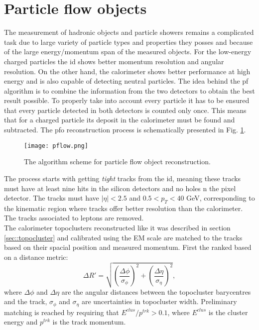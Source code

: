       \section{Particle flow objects}
      The measurement of hadronic objects and particle showers remains a complicated task due to large variety of particle types and properties they posses and because of the large energy/momentum span of the measured objects. For the low-energy charged particles the \gls{id} shows better momentum resolution and angular resolution. On the other hand, the calorimeter shows better performance at high energy and is also capable of detecting neutral particles. The idea behind the \gls{pf} algorithm \cite{pflow} is to combine the information from the two detectors to obtain the best result possible. To properly take into account every particle it has to be ensured that every particle detected in both detectors is counted only once. This means that for a charged particle its deposit in the calorimeter must be found and subtracted. The \gls{pfo} reconstruction process is schematically presented in Fig. \ref{fig::pflow}.
      	\begin{figure}[htbp]
      	\centering
      	\texttt{[image: pflow.png]}
      	\caption[pflow]{The algorithm scheme for particle flow object reconstruction.}
      	\label{fig::pflow}
      \end{figure}
  	  The process starts with getting \textit{tight} tracks from the \gls{id}, meaning these tracks must have at least nine hits in the silicon detectors and no holes n the pixel detector. The tracks must have $|\eta| < 2.5$ and $0.5 < p_T < 40$ GeV, corresponding to the kinematic region where tracks offer better resolution than the calorimeter. The tracks associated to leptons are removed. \\
  	  The calorimeter topoclusters reconstructed like it was described in section \ref{sec::topocluster} and calibrated using the EM scale are matched to the tracks based on their spacial position and measured momentum. First the ranked based on a distance metric:
  	  	\begin{equation}
  	  \Delta R'=\sqrt{\left(\frac{\Delta \phi}{\sigma_{\phi}}\right)^2+\left(\frac{\Delta \eta}{\sigma_{\eta}}\right)^2},
  	  \end{equation}
  	  where $\Delta \phi$ and $\Delta \eta$ are the angular distances between the topocluster barycentres and the track, $\sigma_{\phi}$ and $\sigma_{\eta}$ are uncertainties in topocluster width. Preliminary matching is reached by requiring that $E^{clus}/p^{trk}>0.1$, where $E^{clus}$ is the cluster energy and $p^{trk}$ is the track momentum.\\
